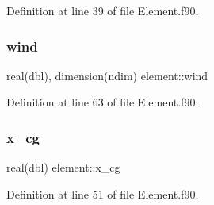Definition at line 39 of file Element.\+f90.

\mbox{\label{namespaceelement_aeced564b191f69b1327f9b9164f371f5}} 
\subsubsection{\texorpdfstring{wind}{wind}}
{\footnotesize\ttfamily real(dbl), dimension(ndim) element\+::wind\hspace{0.3cm}{\ttfamily [private]}}



Definition at line 63 of file Element.\+f90.

\mbox{\label{namespaceelement_aa46e16e8787633edb4e4c0c8c6809ecb}} 
\subsubsection{\texorpdfstring{x\+\_\+cg}{x\_cg}}
{\footnotesize\ttfamily real(dbl) element\+::x\+\_\+cg\hspace{0.3cm}{\ttfamily [private]}}



Definition at line 51 of file Element.\+f90.

